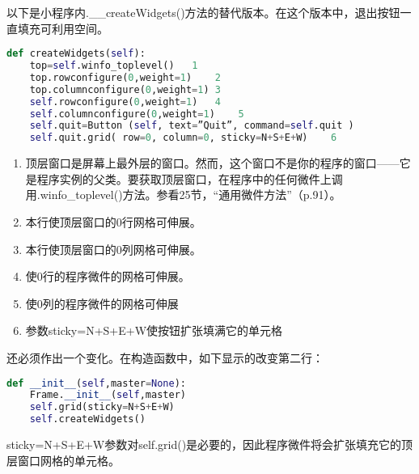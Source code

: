 \documentclass[11pt,a4paper,oneside]{book}
\begin{document}
以下是小程序内.\_\_createWidgets()方法的替代版本。在这个版本中，退出按钮一直填充可利用空间。
\begin{lstlisting}[language=python]
def createWidgets(self):
	top=self.winfo_toplevel()	1
	top.rowconfigure(0,weight=1)	2   
	top.columnconfigure(0,weight=1)	3
	self.rowconfigure(0,weight=1)	4
	self.columnconfigure(0,weight=1)	5
	self.quit=Button (self, text=”Quit”, command=self.quit )
	self.quit.grid( row=0, column=0, sticky=N+S+E+W)	6
\end{lstlisting}
\begin{enumerate}
\item 顶层窗口是屏幕上最外层的窗口。然而，这个窗口不是你的程序的窗口——它是程序实例的父类。要获取顶层窗口，在程序中的任何微件上调用.winfo\_toplevel()方法。参看25节，“通用微件方法”（p.91）。
\item 本行使顶层窗口的0行网格可伸展。 
\item 本行使顶层窗口的0列网格可伸展。
\item 使0行的程序微件的网格可伸展。
\item 使0列的程序微件的网格可伸展
\item 参数sticky=N+S+E+W使按钮扩张填满它的单元格
\end{enumerate}
还必须作出一个变化。在构造函数中，如下显示的改变第二行：
\begin{lstlisting}[language=python]
def __init__(self,master=None):
	Frame.__init__(self,master)
	self.grid(sticky=N+S+E+W)
	self.createWidgets()
\end{lstlisting}
sticky=N+S+E+W参数对self.grid()是必要的，因此程序微件将会扩张填充它的顶层窗口网格的单元格。
\end{document}
